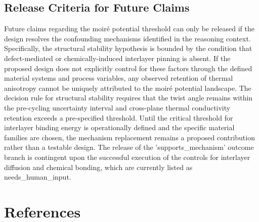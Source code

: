 \documentclass[conference]{IEEEtran}
\begin{document}
\subsection{Release Criteria for Future Claims}
Future claims regarding the moiré potential threshold can only be released if the design resolves the confounding mechanisms identified in the reasoning context. Specifically, the structural stability hypothesis is bounded by the condition that defect-mediated or chemically-induced interlayer pinning is absent. If the proposed design does not explicitly control for these factors through the defined material systems and process variables, any observed retention of thermal anisotropy cannot be uniquely attributed to the moiré potential landscape. The decision rule for structural stability requires that the twist angle remains within the pre-cycling uncertainty interval and cross-plane thermal conductivity retention exceeds a pre-specified threshold. Until the critical threshold for interlayer binding energy is operationally defined and the specific material families are chosen, the mechanism replacement remains a proposed contribution rather than a testable design. The release of the 'supports\_mechanism' outcome branch is contingent upon the successful execution of the controls for interlayer diffusion and chemical bonding, which are currently listed as needs\_human\_input.\section*{References}


\end{document}
